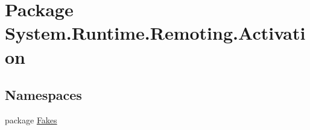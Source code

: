 \hypertarget{namespace_system_1_1_runtime_1_1_remoting_1_1_activation}{\section{Package System.\-Runtime.\-Remoting.\-Activation}
\label{namespace_system_1_1_runtime_1_1_remoting_1_1_activation}
}
\subsection*{Namespaces}
\begin{DoxyCompactItemize}
\item 
package \hyperlink{namespace_system_1_1_runtime_1_1_remoting_1_1_activation_1_1_fakes}{Fakes}
\end{DoxyCompactItemize}
